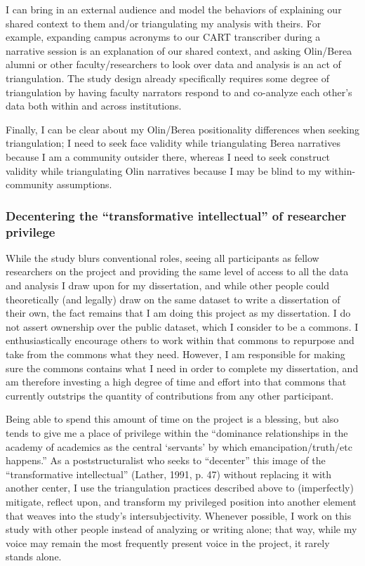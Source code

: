 I can bring in an external audience and model the behaviors of explaining our shared context to them and/or triangulating my analysis with theirs. For example, expanding campus acronyms to our CART transcriber during a narrative session is an explanation of our shared context, and asking Olin/Berea alumni or other faculty/researchers to look over data and analysis is an act of triangulation. The study design already specifically requires some degree of triangulation by having faculty narrators respond to and co-analyze each other’s data both within and across institutions.

Finally, I can be clear about my Olin/Berea positionality differences when seeking triangulation; I need to seek face validity while triangulating Berea narratives because I am a community outsider there, whereas I need to seek construct validity while triangulating Olin narratives because I may be blind to my within-community assumptions.

\subsubsection{Decentering the “transformative intellectual” of researcher privilege}

While the study blurs conventional roles, seeing all participants as fellow researchers on the project and providing the same level of access to all the data and analysis I draw upon for my dissertation, and while other people could theoretically (and legally) draw on the same dataset to write a dissertation of their own, the fact remains that I am doing this project as my dissertation. I do not assert ownership over the public dataset, which I consider to be a commons. I enthusiastically encourage others to work within that commons to repurpose and take from the commons what they need. However, I am responsible for making sure the commons contains what I need in order to complete my dissertation, and am therefore investing a high degree of time and effort into that commons that currently outstrips the quantity of contributions from any other participant.

Being able to spend this amount of time on the project is a blessing, but also tends to give me a place of privilege within the “dominance relationships in the academy of academics as the central ‘servants’ by which emancipation/truth/etc happens.” As a poststructuralist who seeks to “decenter” this image of the “transformative intellectual” (Lather, 1991, p. 47) without replacing it with another center, I use the triangulation practices described above to (imperfectly) mitigate, reflect upon, and transform my privileged position into another element that weaves into the study’s intersubjectivity. Whenever possible, I work on this study with other people instead of analyzing or writing alone; that way, while my voice may remain the most frequently present voice in the project, it rarely stands alone.

